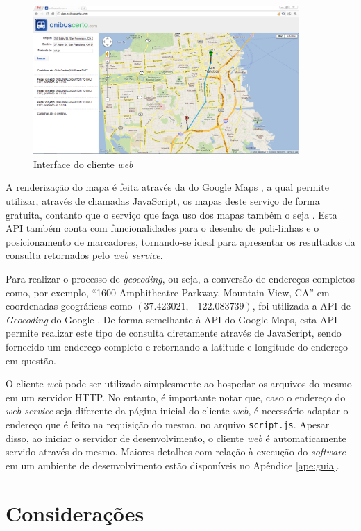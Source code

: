 \begin{figure}[!htb]
	\centering
	\includegraphics[width=0.9\textwidth]{./imgs/clienteweb.png}
	\caption[Interface do cliente \emph{web}]{Interface do cliente \emph{web}}
	\label{fig:clienteweb}
\end{figure}

A renderização do mapa é feita através da  do Google Maps \cite{gmapsapi}, a qual permite utilizar, através de chamadas JavaScript, os mapas deste serviço de forma gratuita, contanto que o serviço que faça uso dos mapas também o seja \cite{gmapsterms}.
Esta API também conta com funcionalidades para o desenho de poli-linhas e o posicionamento de marcadores, tornando-se ideal para apresentar os resultados da consulta retornados pelo \emph{web service}.

Para realizar o processo de \emph{geocoding}, ou seja, a conversão de endereços completos como, por exemplo, ``1600 Amphitheatre Parkway, Mountain View, CA'' em coordenadas geográficas como $(37.423021, -122.083739)$, foi utilizada a API de \emph{Geocoding} do Google \cite{geocodingapi}.
De forma semelhante à API do Google Maps, esta API permite realizar este tipo de consulta diretamente através de JavaScript, sendo fornecido um endereço completo e retornando a latitude e longitude do endereço em questão.

O cliente \emph{web} pode ser utilizado simplesmente ao hospedar os arquivos do mesmo em um servidor HTTP.
No entanto, é importante notar que, caso o endereço do \emph{web service} seja diferente da página inicial do cliente \emph{web}, é necessário adaptar o endereço que é feito na requisição do mesmo, no arquivo \texttt{script.js}.
Apesar disso, ao iniciar o servidor de desenvolvimento, o cliente \emph{web} é automaticamente servido através do mesmo.
Maiores detalhes com relação à execução do \emph{software} em um ambiente de desenvolvimento estão disponíveis no Apêndice \ref{ape:guia}.

\section{Considerações}
